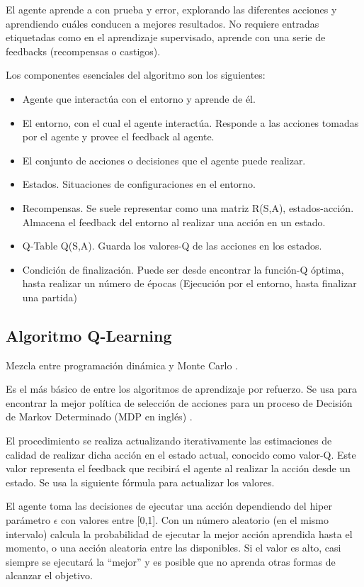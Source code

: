 El agente aprende a con prueba y error, explorando las diferentes acciones y aprendiendo cuáles conducen a mejores resultados. No requiere entradas etiquetadas como en el aprendizaje supervisado, aprende con una serie de feedbacks (recompensas o castigos).

\begin{flushleft}
	Los componentes esenciales del algoritmo son los siguientes:
\end{flushleft}
\begin{itemize}
	\item Agente que interactúa con el entorno y aprende de él. 
	\item El entorno, con el cual el agente interactúa. Responde a las acciones tomadas por el agente y provee el feedback al agente.
	\item El conjunto de acciones o decisiones que el agente puede realizar.
	\item Estados. Situaciones de configuraciones en el entorno.
	\item Recompensas. Se suele representar como una matriz R(S,A), estados-acción. Almacena el feedback del entorno al realizar una acción en un estado.
	\item Q-Table Q(S,A). Guarda los valores-Q de las acciones en los estados.
	\item Condición de finalización. Puede ser desde encontrar la función-Q óptima, hasta realizar un número de épocas (Ejecución por el entorno, hasta finalizar una partida)
\end{itemize}


\subsection{Algoritmo Q-Learning} 
Mezcla entre programación dinámica y Monte Carlo \cite{wang2012monte}.

Es el más básico de entre los algoritmos de aprendizaje por refuerzo. Se usa para encontrar la mejor política de selección de acciones para un proceso de Decisión de Markov Determinado (MDP en inglés) \cite{garcia2013markov}. 

El procedimiento se realiza actualizando iterativamente las estimaciones de calidad de realizar dicha acción en el estado actual, conocido como valor-Q. Este valor representa el feedback que recibirá el agente al realizar la acción desde un estado. Se usa la siguiente fórmula para actualizar los valores.

El agente toma las decisiones de ejecutar una acción dependiendo del hiper parámetro $\epsilon$  con valores entre [0,1]. Con un número aleatorio (en el mismo intervalo) calcula la probabilidad de ejecutar la mejor acción aprendida hasta el momento, o una acción aleatoria entre las disponibles. Si el valor es alto, casi siempre se ejecutará la “mejor” y es posible que no aprenda otras formas de alcanzar el objetivo.



